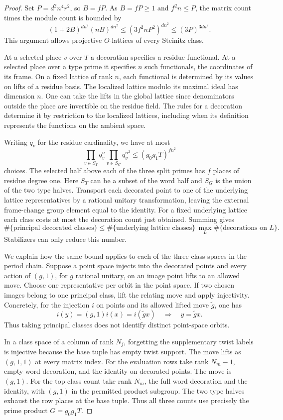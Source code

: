 \begin{proof}
Set \(P=d^2 n^4 r^2\), so \(B=fP\). As \(B=fP\ge1\) and \(f^2n\le P\), the matrix count times the
module count is bounded by
\[
 (1+2B)^{dn^2}(nB)^{dn^2}
    \le (3f^2nP^2)^{dn^2}\le(3P)^{3dn^2}.
\] This
argument allows projective \(O\)-lattices of every Steinitz class.

At a selected place \(v\) over \(T\) a decoration specifies a
residue functional. At a selected place over a type prime it
specifies \(n\) such functionals, the coordinates of its frame.
On a fixed lattice of rank \(n\), each functional is determined by
its values on lifts of a residue basis. The localized lattice
modulo its maximal ideal has dimension \(n\). One can take the
lifts in the global lattice since denominators outside the place
are invertible on the residue field. The rules for a decoration
determine it by restriction to the localized lattices, including
when its definition represents the functions on the ambient space.

Writing \(q_v\) for the residue cardinality, we have at most
\[
        \prod_{v\in S_T}q_v^n\prod_{v\in S_G}q_v^{n^2}
          \le (g_0g_1T)^{fn^2}
\]
choices. The selected half above each of the three split primes has
\(f\) places of residue degree one. Here \(S_T\) can be a subset
of the word half and \(S_G\) is the union of the two type halves.
Transport each decorated point to one of the underlying lattice
representatives by a rational unitary transformation, leaving the
external frame-change group element equal to the identity. For a fixed underlying lattice each class costs at most the decoration count just obtained. Summing gives
\[
 \#\{\text{principal decorated classes}\}\le \#\{\text{underlying lattice classes}\}\,\max_L\#\{\text{decorations on }L\}.
\] Stabilizers can only reduce this number.

We explain how the same bound applies to each of the three class
spaces in the period chain. Suppose a point space injects into the
decorated points and every action of \((g,1)\), for \(g\) rational
unitary, on an image point lifts to an allowed move. Choose one
representative per orbit in the point space. If two chosen images
belong to one principal class, lift the relating move and apply
injectivity. Concretely, for the injection \(i\) on points and its allowed lifted
move \(\tilde g\), one has
\[
 i(y)=(g,1)i(x)=i(\tilde g x)\quad\Longrightarrow\quad y=\tilde g x .
\]
Thus taking principal classes does not identify distinct point-space
orbits.

In a class space of
a column of rank \(N_j\), forgetting the supplementary twist
labels is injective because the base tuple has empty twist
support. The move lifts as \((g,1,1)\) at every matrix index.
For the evaluation rows take rank \(N_m-1\), empty word decoration,
and the identity on decorated points. The move is \((g,1)\).
For the top class count take rank \(N_m\), the full word decoration
and the identity, with \((g,1)\) in the permitted product subgroup.
The two type halves exhaust the row places at the base tuple. Thus
all three counts use precisely the prime product \(G=g_0g_1T\).


\end{proof}
